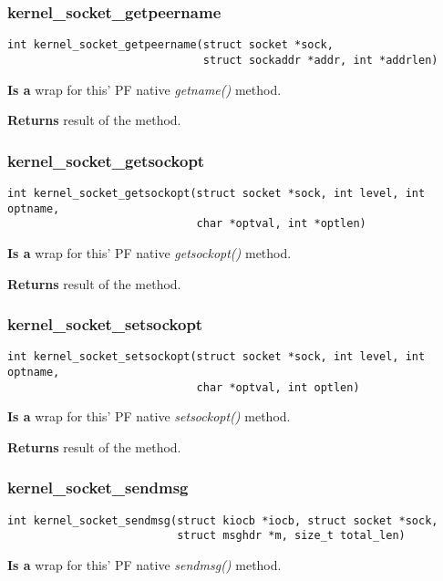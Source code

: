 \documentclass[12pt,a4paper]{article}
\begin{document}
\subsubsection{kernel\_socket\_getpeername}
\label{sec:kernel_socket_kernel_socket_getpeername}
\begin{verbatim}
int kernel_socket_getpeername(struct socket *sock,
                              struct sockaddr *addr, int *addrlen)
\end{verbatim}
{\bf Is a} wrap for this' PF native {\it getname()} method.

{\bf Returns} result of the method.


\subsubsection{kernel\_socket\_getsockopt}
\label{sec:kernel_socket_kernel_socket_getsockopt}
\begin{verbatim}
int kernel_socket_getsockopt(struct socket *sock, int level, int optname,
                             char *optval, int *optlen)
\end{verbatim}
{\bf Is a} wrap for this' PF native {\it getsockopt()} method.

{\bf Returns} result of the method.


\subsubsection{kernel\_socket\_setsockopt}
\label{sec:kernel_socket_kernel_socket_setsockopt}
\begin{verbatim}
int kernel_socket_setsockopt(struct socket *sock, int level, int optname,
                             char *optval, int optlen)
\end{verbatim}
{\bf Is a} wrap for this' PF native {\it setsockopt()} method.

{\bf Returns} result of the method.


\subsubsection{kernel\_socket\_sendmsg}
\label{sec:kernel_socket_kernel_socket_sendmsg}
\begin{verbatim}
int kernel_socket_sendmsg(struct kiocb *iocb, struct socket *sock,
                          struct msghdr *m, size_t total_len)
\end{verbatim}
{\bf Is a} wrap for this' PF native {\it sendmsg()} method.
\end{document}
